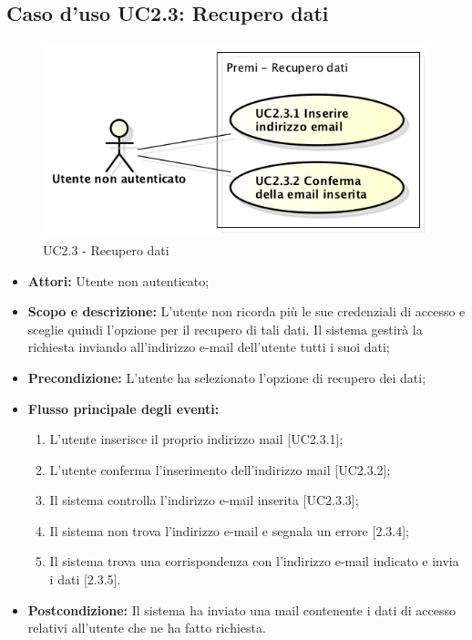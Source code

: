 \subsection{Caso d'uso UC2.3: Recupero dati}
\begin{figure}[h] 
	\centering 
	\includegraphics[scale=0.45] {img/UC2.3.png}
	\caption{UC2.3 - Recupero dati} 
\end{figure}
\begin{itemize}
	\item \textbf{Attori:} Utente non autenticato;
	\item \textbf{Scopo e descrizione:} L'utente non ricorda più le sue credenziali di accesso e sceglie quindi l'opzione per il recupero di tali dati. Il sistema gestirà la richiesta inviando all'indirizzo e-mail dell'utente tutti i suoi dati;
	\item \textbf{Precondizione:} L'utente ha selezionato l'opzione di recupero dei dati;
	\item \textbf{Flusso principale degli eventi:}
	\begin{enumerate}
		\item L'utente inserisce il proprio indirizzo mail [UC2.3.1];
		\item L'utente conferma l'inserimento dell'indirizzo mail [UC2.3.2];
		\item Il sistema controlla l'indirizzo e-mail inserita [UC2.3.3];
		\item Il sistema non trova l'indirizzo e-mail e segnala un errore [2.3.4];
		\item Il sistema trova una corrispondenza con l'indirizzo e-mail indicato e invia i dati [2.3.5].
	\end{enumerate}
	\item \textbf{Postcondizione:} Il sistema ha inviato una mail contenente i dati di accesso relativi all'utente che ne ha fatto richiesta.
\end{itemize}

